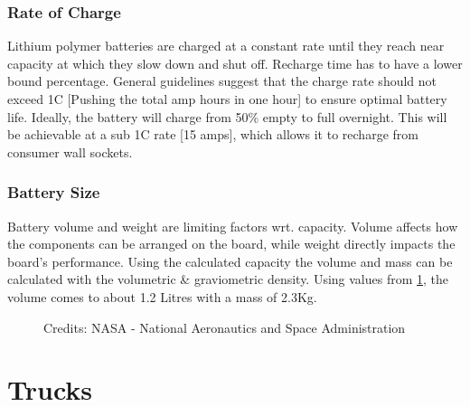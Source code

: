 \documentclass[journal,10pt]{IEEEtran}
\begin{document}
        \subsubsection{Rate of Charge}
            Lithium polymer batteries are charged at a constant rate until they reach near capacity at which they slow down and shut off. Recharge time has to have a lower bound percentage. General guidelines suggest that the charge rate should not exceed 1C [Pushing the total amp hours in one hour] to ensure optimal battery life. Ideally, the battery will charge from 50\% empty to full overnight. This will be achievable at a sub 1C rate [15 amps], which allows it to recharge from consumer wall sockets.
        \subsubsection{Battery Size}
        Battery volume and weight are limiting factors wrt. capacity. Volume affects how the components can be arranged on the board, while weight directly impacts the board's performance.    
        Using the calculated capacity the volume and mass can be calculated with the volumetric \& graviometric density. Using values from \ref{fig:Battery Size}, the volume comes to about 1.2 Litres with a mass of 2.3Kg.
            \begin{figure}[H]
                \centering
                \caption{Credits: NASA - National Aeronautics and Space Administration \cite{BatteryDensity}}
                \label{fig:Battery Size}
            \end{figure}
\section{Trucks}
\end{document}
